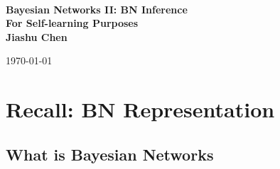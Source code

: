 \documentclass[11pt,a4paper]{report}
\newcommand{\school}{}
\newcommand{\degree}{}
\newcommand{\projtitle}{Bayesian Networks II: BN Inference}
\newcommand{\subtitle}{For Self-learning Purposes}
\newcommand{\projauthor}{Jiashu Chen}
\begin{document}
\setcounter{page}{1}
\pagestyle{plain}


\begin{titlepage}
\center

\vspace{-15mm}
{\large \textbf{\textsc{\school}}}\\

\vfill

{\Large \textbf{\projtitle}}\\[8mm]
{\large \textbf{\subtitle}}\\[28mm]

{\Large \textbf{\projauthor}}\\

\vfill


\vfill

\today

\end{titlepage}


\tableofcontents


\chapter{Recall: BN Representation}

\pagestyle{fancy}
\setcounter{page}{1}

\section{What is Bayesian Networks}
\end{document}
